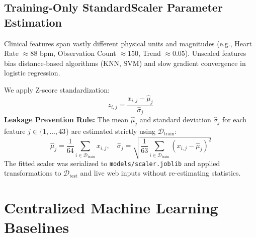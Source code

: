 \subsection{Training-Only StandardScaler Parameter Estimation}
\label{subsec:feature_scaling}

Clinical features span vastly different physical units and magnitudes (e.g., Heart Rate $\approx 88$ bpm, Observation Count $\approx 150$, Trend $\approx 0.05$). Unscaled features bias distance-based algorithms (KNN, SVM) and slow gradient convergence in logistic regression.

We apply Z-score standardization:
\begin{equation}
z_{i, j} = \frac{x_{i, j} - \hat{\mu}_j}{\hat{\sigma}_j}
\end{equation}
\textbf{Leakage Prevention Rule:} The mean $\hat{\mu}_j$ and standard deviation $\hat{\sigma}_j$ for each feature $j \in \{1, \dots, 43\}$ are estimated strictly using $\mathcal{D}_{\text{train}}$:
\begin{equation}
\hat{\mu}_j = \frac{1}{64} \sum_{i \in \mathcal{D}_{\text{train}}} x_{i, j}, \quad \hat{\sigma}_j = \sqrt{\frac{1}{63} \sum_{i \in \mathcal{D}_{\text{train}}} (x_{i, j} - \hat{\mu}_j)^2}
\end{equation}
The fitted scaler was serialized to \texttt{models/scaler.joblib} and applied transformations to $\mathcal{D}_{\text{test}}$ and live web inputs without re-estimating statistics.

\section{Centralized Machine Learning Baselines}
\label{sec:centralized_models}

